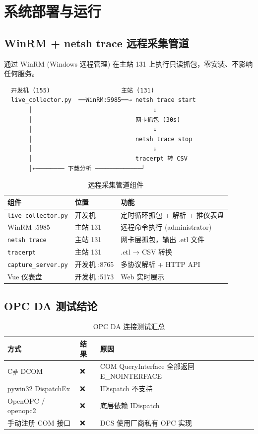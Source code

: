 \documentclass[12pt,a4paper]{ctexart}
\newcommand{\code}[1]{\texttt{\small #1}}
\begin{document}
\section{系统部署与运行}

\subsection{WinRM + netsh trace 远程采集管道}

通过 WinRM (Windows 远程管理) 在主站 131 上执行只读抓包，零安装、不影响任何服务。

\begin{verbatim}
  开发机 (155)                    主站 (131)
  live_collector.py  ──WinRM:5985──→ netsh trace start
       │                                  ↓
       │                             网卡抓包 (30s)
       │                                  ↓
       │                             netsh trace stop
       │                                  ↓
       │                             tracerpt 转 CSV
       │←──────── 下载分析 ─────────────┘
\end{verbatim}

\begin{table}[H]\centering
\caption{远程采集管道组件}
\begin{tabular}{p{3cm} p{5cm} p{4.5cm}}
\toprule
\textbf{组件} & \textbf{位置} & \textbf{功能} \\
\midrule
\code{live\_collector.py} & 开发机 & 定时循环抓包 + 解析 + 推仪表盘 \\
WinRM :5985 & 主站 131 & 远程命令执行 (administrator) \\
\code{netsh trace} & 主站 131 & 网卡层抓包，输出 .etl 文件 \\
\code{tracerpt} & 主站 131 & .etl → CSV 转换 \\
\code{capture\_server.py} & 开发机 :8765 & 多协议解析 + HTTP API \\
Vue 仪表盘 & 开发机 :5173 & Web 实时展示 \\
\bottomrule
\end{tabular}
\end{table}

\subsection{OPC DA 测试结论}

\begin{table}[H]\centering
\caption{OPC DA 连接测试汇总}
\begin{tabular}{p{3cm} p{2.5cm} p{6.5cm}}
\toprule
\textbf{方式} & \textbf{结果} & \textbf{原因} \\
\midrule
C\# DCOM & ❌ & COM QueryInterface 全部返回 E\_NOINTERFACE \\
pywin32 DispatchEx & ❌ & IDispatch 不支持 \\
OpenOPC / openopc2 & ❌ & 底层依赖 IDispatch \\
手动注册 COM 接口 & ❌ & DCS 使用厂商私有 OPC 实现 \\
\bottomrule
\end{tabular}
\end{table}
\end{document}
